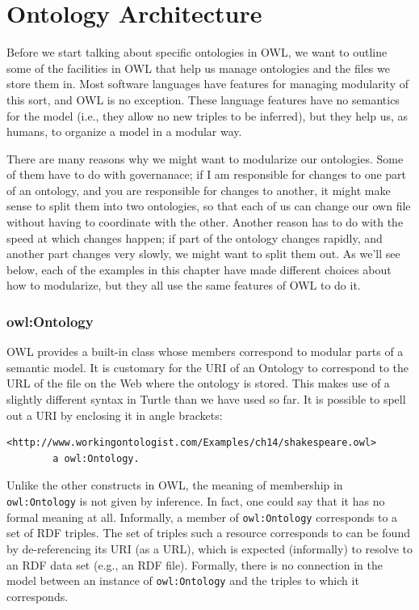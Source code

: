 \section{Ontology Architecture}

Before we start talking about specific ontologies in OWL, we want to 
outline some of the facilities in OWL that help us manage ontologies and
the files we store them in.     Most software languages
have features for managing modularity of this sort, and OWL is no
exception.
These language features have no semantics for the model (i.e., they allow no
new triples to be inferred), but they help us, as humans, to organize a
model in a modular way.

There are many reasons why we might want to 
modularize our ontologies.  Some of them have to do with governanace; if
I am responsible for changes to one part of an ontology, and you are 
responsible for changes to another, it might make sense to split them 
into two ontologies, so that each of us can change our own file without 
having to coordinate with the other.   Another reason has to do with 
the speed at which changes happen; if part of the ontology changes rapidly, 
and another part changes very slowly, we might want to split them out. 
As we'll see below, each of the examples in this chapter have made different
choices about how to modularize, but they all use the same features of OWL
to do it.  


\subsubsection{owl:Ontology}

OWL provides a built-in class whose members correspond to modular parts
of a semantic model. It is customary for the URI of an Ontology to
correspond to the URL of the file on the Web where the ontology is
stored. This makes use of a slightly different syntax in Turtle than we
have used so far. It is possible to spell out a URI by enclosing it in
angle brackets:

\begin{lstlisting}
<http://www.workingontologist.com/Examples/ch14/shakespeare.owl>
        a owl:Ontology.
\end{lstlisting}

Unlike the other constructs in OWL, the meaning of membership in
\texttt{owl:Ontology} is not given by inference. In fact, one could say that it
has no formal meaning at all. Informally, a member of \texttt{owl:Ontology}
corresponds to a set of RDF triples. The set of triples such a resource
corresponds to can be found by de-referencing its URI (as a URL), which
is expected (informally) to resolve to an RDF data set (e.g., an RDF
file). Formally, there is no connection in the model between an instance
of \texttt{owl:Ontology} and the triples to which it corresponds.

